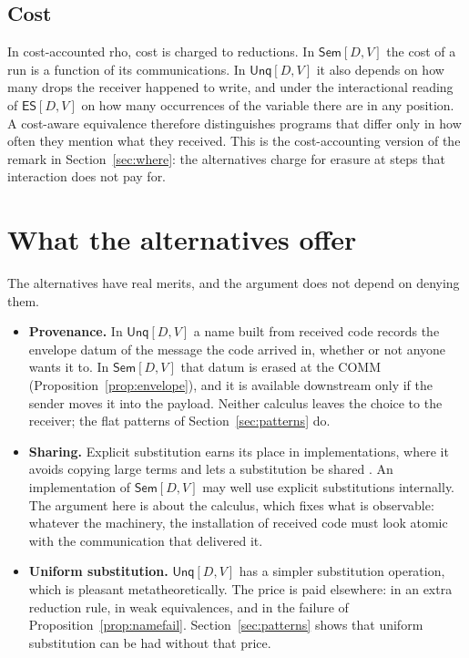 \documentclass[11pt,a4paper]{article}
\theoremstyle{plain}
\theoremstyle{definition}
\theoremstyle{remark}
\newcommand{\rhoc}{\textsf{rho}}
\newcommand{\Sem}{\textsf{Sem}[D,V]}
\newcommand{\Unq}{\textsf{Unq}[D,V]}
\newcommand{\ES}{\textsf{ES}[D,V]}
\begin{document}
\subsection{Cost}

In cost-accounted \rhoc{}, cost is charged to reductions. In $\Sem$ the cost
of a run is a function of its communications. In $\Unq$ it also depends on how
many drops the receiver happened to write, and under the interactional reading
of $\ES$ on how many occurrences of the variable there are in any position. A
cost-aware equivalence therefore distinguishes programs that differ only in how
often they mention what they received. This is the cost-accounting version of
the remark in Section~\ref{sec:where}: the alternatives charge for erasure at
steps that interaction does not pay for.

\section{What the alternatives offer}\label{sec:fair}

The alternatives have real merits, and the argument does not depend on
denying them.

\begin{itemize}[leftmargin=1.5em]
\item \textbf{Provenance.} In $\Unq$ a name built from received code records
  the envelope datum of the message the code arrived in, whether or not anyone
  wants it to. In $\Sem$ that datum is erased at the COMM
  (Proposition~\ref{prop:envelope}), and it is available downstream only if
  the sender moves it into the payload. Neither calculus leaves the choice to
  the receiver; the flat patterns of Section~\ref{sec:patterns} do.
\item \textbf{Sharing.} Explicit substitution earns its place in
  implementations, where it avoids copying large terms and lets a substitution
  be shared \cite{ACCL91}. An implementation of $\Sem$ may well use explicit
  substitutions internally. The argument here is about the calculus, which
  fixes what is observable: whatever the machinery, the installation of
  received code must look atomic with the communication that delivered it.
\item \textbf{Uniform substitution.} $\Unq$ has a simpler substitution
  operation, which is pleasant metatheoretically. The price is paid
  elsewhere: in an extra reduction rule, in weak equivalences, and in the
  failure of Proposition~\ref{prop:namefail}. Section~\ref{sec:patterns}
  shows that uniform substitution can be had without that price.
\end{itemize}
\end{document}

